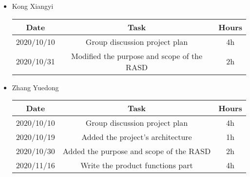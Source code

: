 \documentclass[a4paper,12pt]{book}
\begin{document}
\begin{itemize}
	\item Kong Xiangyi
	\begin{center}
		\begin{tabular}{ |c|c|c| } 
			\hline
			Date & Task & Hours \\
			\hline
			\hline
			2020/10/10 & Group discussion project plan & 4h \\ 
			\hline
			2020/10/31 & Modified the purpose and scope of the RASD & 2h \\ 
			\hline
		\end{tabular}
	\end{center}

	\item Zhang Yuedong
	\begin{center}
		\begin{tabular}{ |c|c|c| } 
			\hline
			Date & Task & Hours \\
			\hline
			\hline
			2020/10/10 & Group discussion project plan & 4h \\ 
			\hline
			2020/10/19 & Added the project's architecture & 1h \\ 
			\hline
			2020/10/30 & Added the purpose and scope of the RASD & 2h \\ 
			\hline
			2020/11/16 & Write the product functions part & 4h \\ 
			\hline
		\end{tabular}
	\end{center}
\end{itemize}


\backmatter
\end{document}
